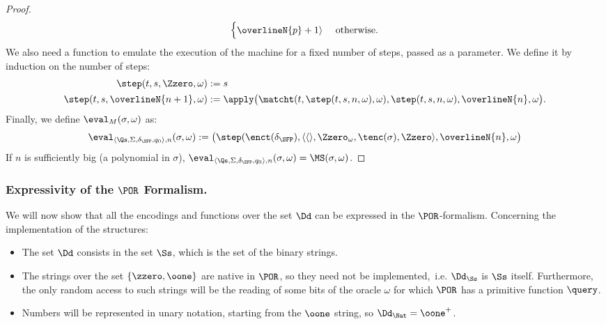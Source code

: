 \begin{proof}
\begin{align*}
\begin{cases}
{\overlineN{p}}+1\rangle \ &\text{otherwise.}
\end{cases}
\end{align*}
We also need a function to emulate
the execution of the machine
for a fixed number of steps,
passed as a parameter.
We define it by induction on the number of steps:
\begin{align*}
\step(t,s,{\Zzero},\omega) &:= s \\
\step(t,s,\overlineN{n+1},\omega) &:= \apply\big(\matcht(t,\step(t,s,n,\omega),
\omega), \step(t,s,n,\omega), \overlineN{n},
\omega\big).
\end{align*}
Finally, we define $\eval_M(\sigma,\omega)$
as:
$$
{
\eval_{\langle \Qs, \Sigma, \delta_{\SFP}, q_0\rangle{,n}}
(\sigma, \omega) := \big(\step(\enct(\delta_\SFP),
\langle \langle \rangle, {\Zzero_\omega},
\tenc(\sigma), {\Zzero}\rangle,
\overlineN{n},\omega\big)}
$$
If $n$ is sufficiently big (a polynomial in $\sigma$),
$\eval_{\langle\Qs,\Sigma,\delta_\SFP, q_0\rangle,n}(
\sigma,\omega)=\MS(\sigma,\omega)$.
\end{proof}



































\subsubsection{Expressivity of the $\POR$ Formalism.}
We will now show that all the encodings and functions
over the set $\Dd$ can be expressed in the
$\POR$-formalism.
Concerning the implementation
of the structures:
\begin{itemize}
\itemsep0em
\item The set $\Dd$ consists in the set $\Ss$,
which is the set of the binary strings.

\item The strings over the
set
$\{\zzero,\oone\}$ are native in $\POR$,
so they need not be implemented,~i.e.
$\Dd_\Ss$ is $\Ss$ itself.
Furthermore,
the only random access to such strings will be
the reading of some bits of the oracle
$\omega$
for which $\POR$ has a primitive function $\query$.

\item Numbers will be represented in unary notation,
starting from the $\oone$ string, so $\Dd_\Nat=\oone^+$.
\end{itemize}


